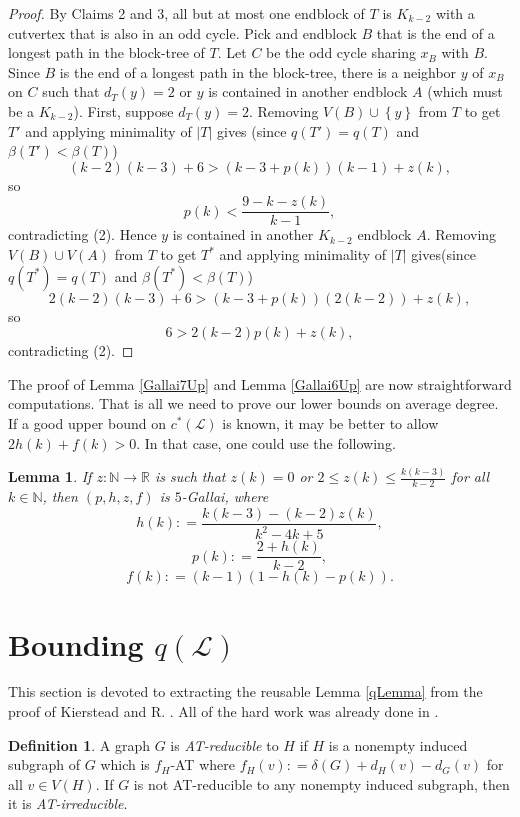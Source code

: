 \documentclass[10pt]{article}
\renewcommand{\le}{\leqslant}
\theoremstyle{plain}
\newtheorem{lem}[thm]{Lemma}
\theoremstyle{definition}
\newtheorem{defn}{Definition}
\theoremstyle{remark}
\newcommand{\fancy}[1]{\mathcal{#1}}
\newcommand{\IN}{\mathbb{N}}
\newcommand{\IR}{\mathbb{R}}
\renewcommand{\L}{\fancy{L}}
\newcommand{\set}[1]{\left\{ #1 \right\}}
\newcommand{\card}[1]{\left|#1\right|}
\newcommand{\func}[3]{#1\colon #2 \rightarrow #3}
\newcommand{\parens}[1]{\left( #1 \right)}
\newcommand{\DefinedAs}{\mathrel{\mathop:}=}
\begin{document}
\begin{proof}
By Claims 2 and 3, all but at most one endblock of $T$ is $K_{k-2}$ with a cutvertex that is also in an odd cycle. 
Pick and endblock $B$ that is the end of a
longest path in the block-tree of $T$.  Let $C$ be the odd cycle sharing $x_B$ with $B$.  Since $B$ is the end of a longest path in the block-tree, there is
a neighbor $y$ of $x_B$ on $C$ such that $d_T(y) = 2$ or $y$ is contained in another endblock $A$ (which must be a $K_{k-2}$).  
First, suppose $d_T(y) = 2$.
Removing $V(B) \cup \set{y}$ from $T$ to get $T'$ and applying minimality of $\card{T}$ gives (since $q(T') = q(T)$ and $\beta(T') < \beta(T)$)
\[(k-2)(k-3) + 6 > \parens{k-3 + p(k)}\parens{k-1} + z(k),\]
so
\[p(k) < \frac{9-k-z(k)}{k-1},\]
contradicting (2).
Hence $y$ is contained in another $K_{k-2}$ endblock $A$.  Removing $V(B) \cup V(A)$ from $T$ to get $T^*$ and applying minimality of $\card{T}$ gives(since $q(T^*) = q(T)$ and $\beta(T^*) < \beta(T)$)
\[2(k-2)(k-3) + 6 > \parens{k-3 + p(k)}\parens{2(k-2)} + z(k),\]
so
\[6 > 2(k-2)p(k) + z(k),\]
contradicting (2).
\end{proof}

The proof of Lemma \ref{Gallai7Up} and Lemma \ref{Gallai6Up} are now straightforward computations.  
That is all we need to prove our lower bounds on average degree. If a good upper bound on $c^*(\L)$ is known, it may be better to allow $2h(k) + f(k) > 0$.
In that case, one could use the following.

\begin{lem}
If $\func{z}{\IN}{\IR}$ is such that $z(k) = 0$ or $2 \le z(k) \le \frac{k(k-3)}{k-2}$  for all $k \in \IN$, then 
$(p,h,z,f)$ is $5$-Gallai, where
\[h(k) \DefinedAs \frac{k(k-3) - (k-2)z(k)}{k^2-4k+5},\]
\[p(k) \DefinedAs \frac{2 + h(k)}{k-2},\]
\[f(k) \DefinedAs (k-1)(1 - h(k) - p(k)).\]
\end{lem}
\section{Bounding $q(\L)$}
This section is devoted to extracting the reusable Lemma \ref{qLemma} from the proof of Kierstead and R. \cite{OreVizing}.
All of the hard work was already done in \cite{OreVizing}.

\begin{defn}
	A graph $G$ is \emph{AT-reducible} to $H$ if $H$ is a nonempty induced subgraph of $G$ which is $f_H$-AT where $f_H(v) \DefinedAs \delta(G) + d_H(v) - d_G(v)$ for all $v \in V(H)$.  
	If $G$ is not AT-reducible to any nonempty induced subgraph, then it is \emph{AT-irreducible}.
\end{defn}
\end{document}
